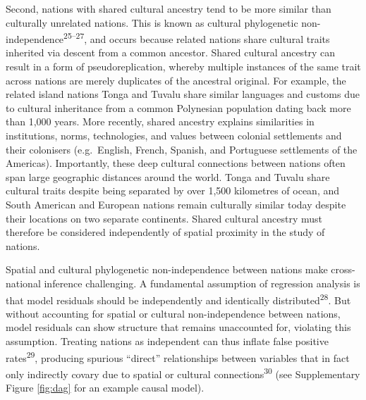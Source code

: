 \documentclass[
  man,floatsintext]{apa6}
\begin{document}
Second, nations with shared cultural ancestry tend to be more similar than culturally unrelated nations. This is known as cultural phylogenetic non-independence\textsuperscript{25--27}, and occurs because related nations share cultural traits inherited via descent from a common ancestor. Shared cultural ancestry can result in a form of pseudoreplication, whereby multiple instances of the same trait across nations are merely duplicates of the ancestral original. For example, the related island nations Tonga and Tuvalu share similar languages and customs due to cultural inheritance from a common Polynesian population dating back more than 1,000 years. More recently, shared ancestry explains similarities in institutions, norms, technologies, and values between colonial settlements and their colonisers (e.g.~English, French, Spanish, and Portuguese settlements of the Americas). Importantly, these deep cultural connections between nations often span large geographic distances around the world. Tonga and Tuvalu share cultural traits despite being separated by over 1,500 kilometres of ocean, and South American and European nations remain culturally similar today despite their locations on two separate continents. Shared cultural ancestry must therefore be considered independently of spatial proximity in the study of nations.

Spatial and cultural phylogenetic non-independence between nations make cross-national inference challenging. A fundamental assumption of regression analysis is that model residuals should be independently and identically distributed\textsuperscript{28}. But without accounting for spatial or cultural non-independence between nations, model residuals can show structure that remains unaccounted for, violating this assumption. Treating nations as independent can thus inflate false positive rates\textsuperscript{29}, producing spurious ``direct'' relationships between variables that in fact only indirectly covary due to spatial or cultural connections\textsuperscript{30} (see Supplementary Figure \ref{fig:dag} for an example causal model).
\end{document}
